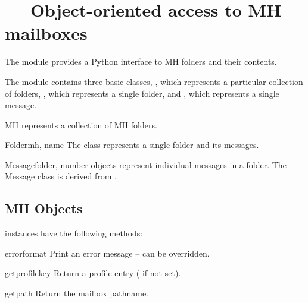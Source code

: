 
\section{ ---
         Object-oriented access to MH mailboxes}



The  module provides a Python interface to MH folders and
their contents.

The module contains three basic classes, , which represents a
particular collection of folders, , which represents a single
folder, and , which represents a single message.


\begin{classdesc}{MH}{}
 represents a collection of MH folders.
\end{classdesc}

\begin{classdesc}{Folder}{mh, name}
The  class represents a single folder and its messages.
\end{classdesc}

\begin{classdesc}{Message}{folder, number}
 objects represent individual messages in a folder.  The
Message class is derived from .
\end{classdesc}


\subsection{MH Objects \label{mh-objects}}

 instances have the following methods:


\begin{methoddesc}[MH]{error}{format}
Print an error message -- can be overridden.
\end{methoddesc}

\begin{methoddesc}[MH]{getprofile}{key}
Return a profile entry ( if not set).
\end{methoddesc}

\begin{methoddesc}[MH]{getpath}{}
Return the mailbox pathname.
\end{methoddesc}


